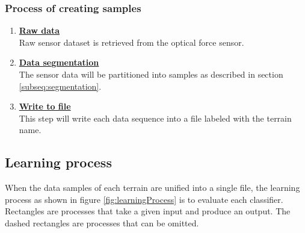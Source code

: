 \documentclass[USenglish]{ifimaster}  %
\begin{document}
\subsubsection{Process of creating samples} \label{sub:createsamples}
	\begin{enumerate}
		\item \textbf{\underline{Raw data}}
		\\
		Raw sensor dataset is retrieved from the optical force sensor.
		
		\item \textbf{\underline{Data segmentation}}
		\\
		The sensor data will be partitioned into samples as described in section \ref{subseq:segmentation}.
		
		\item \textbf{\underline{Write to file}}
		\\
		This step will write each data sequence into a file labeled with the terrain name.
		
		
\end{enumerate}
\clearpage

\subsection{Learning process} \label{subsec:learningProc}
When the data samples of each terrain are unified into a single file, the learning process as shown in figure \ref{fig:learningProcess} is to evaluate each classifier. Rectangles are processes that take a given input and produce an output. The dashed rectangles are processes that can be omitted.
\end{document}
